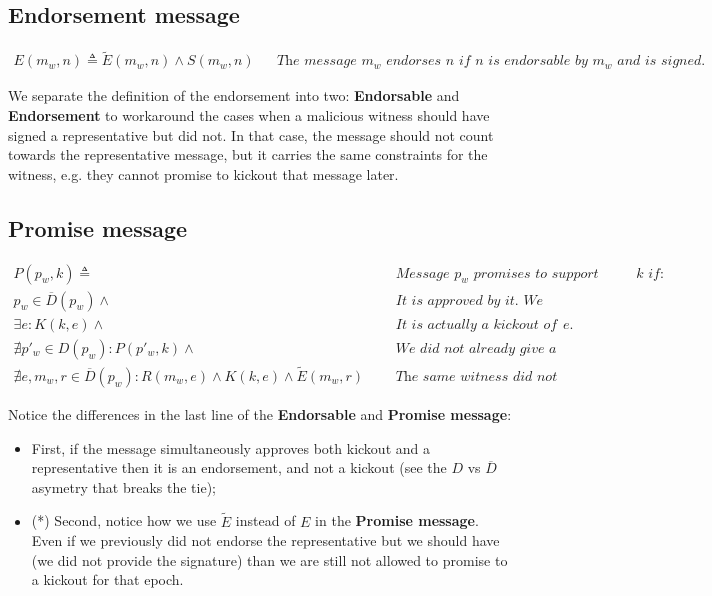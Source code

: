 \documentclass{article}
\begin{document}
    \subsection*{Endorsement message}
    \[
        \begin{aligned}
            E(m_w, n)  \triangleq \widetilde{E}(m_w, n) \land S(m_w, n) && \textit{The message $m_w$ endorses $n$ if $n$ is endorsable by $m_w$ and is signed.}
        \end{aligned}
    \]

    We separate the definition of the endorsement into two: \textbf{Endorsable} and \textbf{Endorsement} to workaround the cases when a malicious witness should have signed a representative but did not. In that case, the message should not count towards the representative message, but it carries the same constraints for the witness, e.g. they cannot promise to kickout that message later.

    \subsection*{Promise message}
    \[
        \begin{aligned}
            P(p_w, k)  \triangleq & \text{   } & \textit{Message $p_w$ promises to support kickout $k$ if:} \\
            p_w\in \overline{D}(p_w) \land & & \textit{It is approved by it. We allow kickout message to promise to itself.} \\
            \exists e: K(k, e) \land & & \textit{It is actually a kickout of some epoch $e$.} \\
            \nexists p'_w\in D(p_w): P(p'_w, k)\land & & \textit{We did not already give a promise with some other message.} \\
            \nexists e, m_w, r\in \overline{D}(p_w): R(m_w, e)\land K(k, e) \land \widetilde{E}(m_w, r) && \textit{The same witness did not already produce and endorsement(*) for the very same epoch.}
        \end{aligned}
    \]

    Notice the differences in the last line of the \textbf{Endorsable} and \textbf{Promise message}:
    \begin{itemize}
        \item First, if the message simultaneously approves both kickout and a representative then it is an endorsement, and not a kickout (see the $D$ vs $\overline{D}$ asymetry that breaks the tie);
        \item (*) Second, notice how we use $\widetilde{E}$ instead of $E$ in the \textbf{Promise message}. Even if we previously did not endorse the representative but we should have (we did not provide the signature) than we are still not allowed to promise to a kickout for that epoch.
    \end{itemize}
\end{document}

